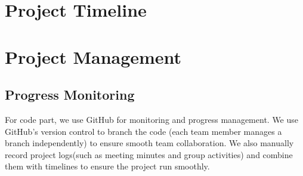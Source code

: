 \documentclass[12pt]{article}
\begin{document}
\section{Project Timeline}

\section{Project Management}
\subsection{Progress Monitoring}
For code part, we use GitHub for monitoring and progress management. We use GitHub's version control to branch the code (each team member manages a branch independently) to ensure smooth team collaboration. We also manually record project logs(such as meeting minutes and group activities) and combine them with timelines to ensure the project run smoothly.

\printbibliography
\printglossaries
\label{sec:glossary}
\end{document}
